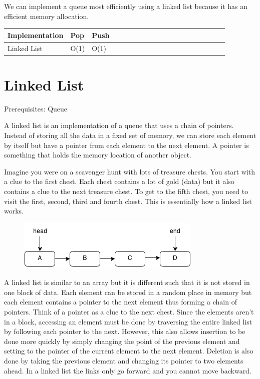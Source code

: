 \documentclass[11pt,oneside]{book}
\makeatletter
\def\maxwidth#1{\ifdim\Gin@nat@width>#1 #1\else\Gin@nat@width\fi}
\makeatother
\begin{document}
        

We can implement a queue most efficiently using a linked list because it has an efficient memory allocation.

\vspace{10px}\begin{tabulary}{0.4\linewidth}{|l|l|l|l|l|l|l|l|l|l|l|l|l|l|l|l|l|l|l}\hline


  Implementation &
  Pop &
  Push\\
\hline


  Linked List &
  O(1) &
  O(1)\\

\hline\end{tabulary}


        \section{ Linked List }
        

Prerequisites: Queue



A linked list is an implementation of a queue that uses a chain of pointers. Instead of storing all the data in a fixed set of memory, we can store each element by itself but have a pointer from each element to the next element. A pointer is something that holds the memory location of another object.

Imagine you were on a scavenger hunt with lots of treasure chests. You start with a clue to the first chest. Each chest contains a lot of gold (data) but it also contains a clue to the next treasure chest. To get to the fifth chest, you need to visit the first, second, third and fourth chest. This is essentially how a linked list works.

\vspace{5px}\begin{figure}[H]\centering
        \includegraphics[width=0.66\maxwidth{\textwidth}]{linkedlist.png}
        \end{figure}

A linked list is similar to an array but it is different such that it is not stored in one block of data. Each element can be stored in a random place in memory but each element contains a pointer to the next element thus forming a chain of pointers. Think of a pointer as a clue to the next chest. Since the elements aren't in a block, accessing an element must be done by traversing the entire linked list by following each pointer to the next. However, this also allows insertion to be done more quickly by simply changing the point of the previous element and setting to the pointer of the current element to the next element. Deletion is also done by taking the previous element and changing its pointer to two elements ahead. In a linked list the links only go forward and you cannot move backward.
\end{document}
